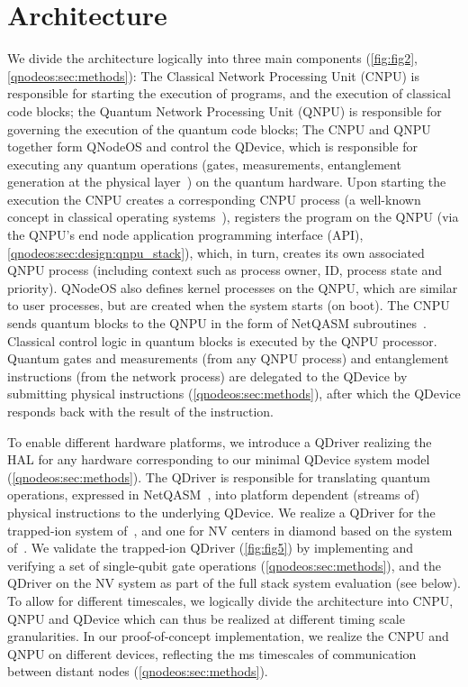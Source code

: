 \section{Architecture}
\label{qnodeos:sec:architecture}
We divide the architecture logically into three main components (\cref{fig:fig2}, \cref{qnodeos:sec:methods}): The Classical Network Processing Unit (CNPU) is responsible for starting the execution of programs, and the execution of classical code blocks; the Quantum Network Processing Unit (QNPU) is responsible for governing the execution of the quantum code blocks; The CNPU and QNPU together form QNodeOS and control the QDevice, which is responsible for executing any quantum operations (gates, measurements, entanglement generation at the physical layer~\cite{dahlberg_2019_egp}) on the quantum hardware. Upon starting the execution the CNPU creates a corresponding CNPU process (a well-known concept in classical operating systems~\cite{dennis_programming_1966-1,tanenbaum_operating_2005}), registers the program on the QNPU (via the QNPU's end node application programming interface (API), \cref{qnodeos:sec:design:qnpu_stack}), which, in turn, creates its own associated QNPU process (including context such as process owner, ID, process state and priority). QNodeOS also defines kernel processes on the QNPU, which are similar to user processes, but are created when the system starts (on boot). The CNPU sends quantum blocks to the QNPU in the form of NetQASM subroutines~\cite{dahlberg_2022_netqasm}. Classical control logic in quantum blocks is executed by the QNPU processor. Quantum gates and measurements (from any QNPU process) and entanglement instructions (from the network process) are delegated to the QDevice by submitting physical instructions (\cref{qnodeos:sec:methods}), after which the QDevice responds back with the result of the instruction. 

To enable different hardware platforms, we introduce a QDriver realizing the HAL for any hardware corresponding to our minimal QDevice system model (\cref{qnodeos:sec:methods}). The QDriver is responsible for translating quantum operations, expressed in NetQASM~\cite{dahlberg_2022_netqasm}, into platform dependent (streams of) physical instructions to the underlying QDevice. We realize a QDriver for the trapped-ion system of~\cite{teller2023integrating,teller2021heating}, and one for NV centers in diamond based on the system of~\cite{hermans2022qubit,pompili_2021_multinode,pompili_2022_experimental}. We validate the trapped-ion QDriver (\cref{fig:fig5}) by implementing and verifying a set of single-qubit gate operations (\cref{qnodeos:sec:methods}), and the QDriver on the NV system as part of the full stack system evaluation (see below). 
To allow for different timescales, we logically divide the architecture into CNPU, QNPU and QDevice which can thus be realized at different timing scale granularities. In our proof-of-concept implementation, we realize the CNPU and QNPU on different devices, reflecting the ms timescales of communication between distant nodes (\cref{qnodeos:sec:methods}).

